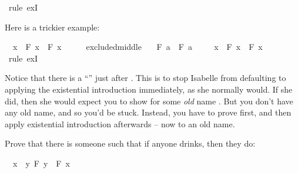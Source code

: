 \begin{isabellebody}
\ {\isacharparenleft}rule\ exI{\isacharparenright}\isanewline
{}\isamarkupfalse%
%
\endisatagproof
{\isafoldproof}%
%
\isadelimproof
%
\endisadelimproof
%
\begin{isamarkuptext}%
Here is a trickier example:%
\end{isamarkuptext}\isamarkuptrue%
\isamarkupfalse%
\ {\isachardoublequoteopen}{\isasymexists}\ x{\isachardot}\ {\isasymnot}\ F\ x\ {\isasymor}\ F\ x{\isachardoublequoteclose}\isanewline
%
\isadelimproof
%
\endisadelimproof
%
\isatagproof
{}\isamarkupfalse%
\ {\isacharminus}\isanewline
\ \ \isamarkupfalse%
\ excluded{\isacharunderscore}middle\ \isamarkupfalse%
\ {\isachardoublequoteopen}{\isasymnot}\ F\ a\ {\isasymor}\ F\ a{\isachardoublequoteclose}\isacommand{{\isachardot}}\isamarkupfalse%
\isanewline
\ \ \isamarkupfalse%
\ {\isachardoublequoteopen}{\isasymexists}\ x{\isachardot}\ {\isasymnot}\ F\ x\ {\isasymor}\ F\ x{\isachardoublequoteclose}\ \isamarkupfalse%
\ {\isacharparenleft}rule\ exI{\isacharparenright}\isanewline
{}\isamarkupfalse%
%
\endisatagproof
{\isafoldproof}%
%
\isadelimproof
%
\endisadelimproof
%
\begin{isamarkuptext}%
Notice that there is a ``\isa{{\isacharminus}}'' just after . This is to stop Isabelle from
defaulting to applying the existential introduction immediately, as she normally would. If she did, then
she would expect you to show  for some \emph{old} name . But you don't
have any old name, and so you'd be stuck. Instead, you have to prove  first, and
then apply existential introduction afterwards -- now to an old name.%
\end{isamarkuptext}\isamarkuptrue%
%
\begin{isamarkuptext}%
\begin{Exercise}[title = The Converse Drinkers Principle]
Prove that there is someone such that if anyone drinks, then they do: \end{Exercise}%
\end{isamarkuptext}\isamarkuptrue%
\isamarkupfalse%
\ {\isachardoublequoteopen}{\isasymexists}\ x{\isachardot}\ {\isacharparenleft}{\isasymexists}\ y{\isachardot}\ F\ y{\isacharparenright}\ {\isasymlongrightarrow}\ F\ x{\isachardoublequoteclose}%
\isadelimproof
\ %
\endisadelimproof
%
\isatagproof
{}\isamarkupfalse%
%
\endisatagproof

\end{isabellebody}
